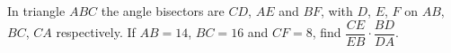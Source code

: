 In triangle $ABC$ the angle bisectors are $CD$, $AE$ and $BF$, with $D$, $E$, $F$ on $AB$, $BC$, $CA$ respectively. If $AB=14$, $BC=16$ and $CF=8$, find $\dfrac{CE}{EB}\cdot\dfrac{BD}{DA}$.

